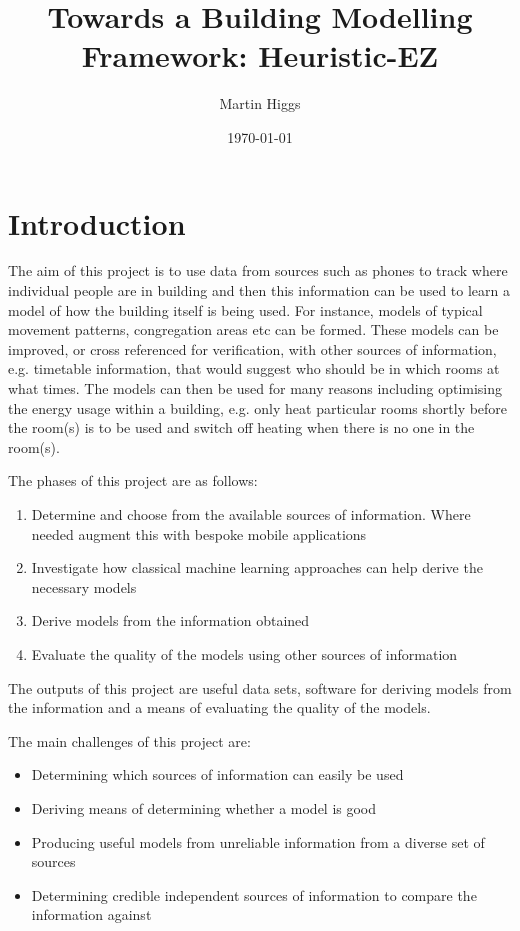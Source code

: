 \documentclass{UoYCSproject}
\title{Towards a Building Modelling Framework: Heuristic-EZ}
\author{Martin Higgs}
\date{\today}
\begin{document}
	
	\maketitle
	
	\chapter{Introduction}
    \label{chap:intro}
    
		The aim of this project is to use data from sources such as phones to track where individual people are in building and then this information can be used to learn a model of how the building itself is being used. For instance, models of typical movement patterns, congregation areas etc can be formed. These models can be improved, or cross referenced for verification, with other sources of information, e.g. timetable information, that would suggest who should be in which rooms at what times. The models can then be used for many reasons including optimising the energy usage within a building, e.g. only heat particular rooms shortly before the room(s) is to be used and switch off heating when there is no one in the room(s).
		
		The phases of this project are as follows:
		\begin{enumerate}
			\item Determine and choose from the available sources of information. Where needed augment this with bespoke mobile applications
			\item Investigate how classical machine learning approaches can help derive the necessary models
			\item Derive models from the information obtained
			\item Evaluate the quality of the models using other sources of information
		\end{enumerate}
		The outputs of this project are useful data sets, software for deriving models from the information and a means of evaluating the quality of the models.
		
		The main challenges of this project are:
		\begin{itemize}
			\item Determining which sources of information can easily be used
			\item Deriving means of determining whether a model is good
			\item Producing useful models from unreliable information from a diverse set of sources
			\item Determining credible independent sources of information to compare the information against
		\end{itemize}
        
\end{document}
